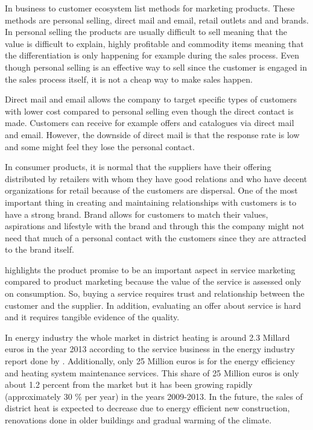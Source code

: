 In business to customer ecosystem \textcite{MarketingPlans:2016} list methods for marketing products. These methods are personal selling, direct mail and email, retail outlets and and brands. In personal selling the products are usually difficult to sell meaning that the value is difficult to explain, highly profitable and commodity items meaning that the differentiation is only happening for example during the sales process. Even though personal selling is an effective way to sell since the customer is engaged in the sales process itself, it is not a cheap way to make sales happen.

Direct mail and email allows the company to target specific types of customers with lower cost compared to personal selling even though the direct contact is made. Customers can receive for example offers and catalogues via direct mail and email. However, the downside of direct mail is that the response rate is low and some might feel they lose the personal contact. \parencite{MarketingPlans:2016}

In consumer products, it is normal that the suppliers have their offering distributed by retailers with whom they have good relations and who have decent organizations for retail because of the customers are dispersal. One of the most important thing in creating and maintaining relationships with customers is to have a strong brand. Brand allows for customers to match their values, aspirations and lifestyle with the brand and through this the company might not need that much of a personal contact with the customers since they are attracted to the brand itself. \parencite{MarketingPlans:2016}

\textcite{MarketingPlans:2016} highlights the product promise to be an important aspect in service marketing compared to product marketing because the value of the service is assessed only on consumption. So, buying a service requires trust and relationship between the customer and the supplier. In addition, evaluating an offer about service is hard and it requires tangible evidence of the quality.

In energy industry the whole market in district heating is around 2.3 Millard euros in the year 2013 according to the service business in the energy industry report done by \textcite{EnergyServiceBusiness:2015}. Additionally, only 25 Million euros is for the energy efficiency and heating system maintenance services. This share of 25 Million euros is only about 1.2 percent from the market but it has been growing rapidly (approximately 30 \% per year) in the years 2009-2013. In the future, the sales of district heat is expected to decrease due to energy efficient new construction, renovations done in older buildings and gradual warming of the climate.

